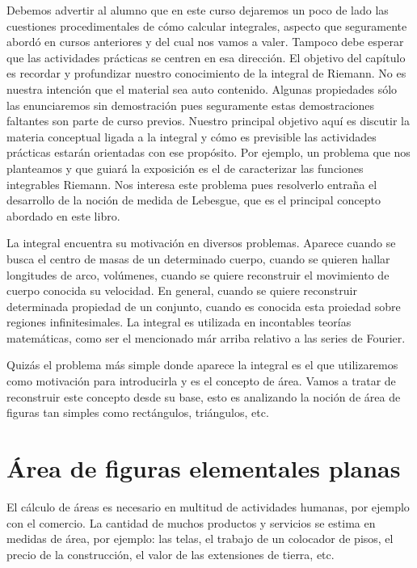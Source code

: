 Debemos advertir  al alumno que en este curso dejaremos un poco de lado las cuestiones procedimentales de cómo calcular integrales, aspecto que seguramente abordó en cursos anteriores y del cual nos vamos a valer. Tampoco debe esperar que las actividades prácticas se centren en esa dirección. El objetivo del capítulo es recordar y profundizar nuestro conocimiento de la integral de Riemann. No es nuestra intención que el material sea auto contenido. Algunas propiedades sólo las enunciaremos sin demostración pues seguramente estas demostraciones faltantes son parte de curso previos.   Nuestro principal objetivo aquí es discutir la materia conceptual ligada a la integral y cómo es previsible las actividades prácticas estarán orientadas con ese propósito. Por ejemplo, un problema que nos planteamos y que guiará la exposición es el de caracterizar las funciones integrables Riemann. Nos interesa este problema pues  resolverlo entraña el desarrollo de la noción de medida de  Lebesgue, que es el principal concepto abordado en este libro.


La integral encuentra su motivación en diversos problemas. Aparece cuando se busca el centro de masas de un determinado cuerpo, cuando se quieren hallar longitudes de arco, volúmenes, cuando se quiere reconstruir el movimiento de cuerpo conocida su velocidad. En general, cuando se quiere reconstruir determinada propiedad de un conjunto, cuando es conocida esta proiedad sobre regiones infinitesimales.  La integral es utilizada en incontables teorías matemáticas, como ser el mencionado már arriba relativo a las series de Fourier. 

Quizás el 
problema más simple donde aparece la integral es el que utilizaremos como motivación para introducirla y es el concepto de área.  Vamos a tratar de reconstruir este concepto desde su base, esto es analizando la noción de área de figuras tan simples como rectángulos, triángulos, etc. 



\section{Área de figuras elementales planas}\label{sec:area_elem}

  
El cálculo de áreas es necesario en multitud de actividades humanas, por ejemplo con el comercio. La cantidad de muchos productos y servicios se estima en medidas de área, por ejemplo: las telas,  el trabajo de un colocador de pisos,  el precio de la construcción,  el valor de las extensiones de tierra, etc.  
 
